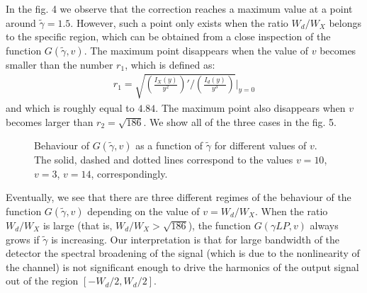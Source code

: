 \documentclass{article}
\begin{document}
In the fig. 4 we observe that the correction reaches a maximum value at a point around $\tilde{\gamma} = 1.5$. However, such a point only exists when the ratio $W_{d}/W_{X}$ belongs to the specific region, which can be obtained from a close inspection of the function $G(\tilde{\gamma}, v)$. The maximum point disappears when the value of $v$ becomes smaller than the number $r_{1}$, which is defined as: 
\begin{eqnarray}\label{5r1definition}
    r_{1} = \sqrt{\left(\frac{I_{X}(y)}{y^{2}}\right)'\bigg/ \left(\frac{I_{d}(y)}{y^{3}}\right)}\bigg |_{y=0}
\end{eqnarray}
and which is roughly equal to $4.84$. The maximum point also disappears when $v$ becomes larger than $r_{2} = \sqrt{186}$. We show all of the three cases in the fig. 5. 
\begin{figure}[hbt!]
	\centering
	\caption{Behaviour of $G(\tilde{\gamma}, v)$ as a function of $\tilde{\gamma}$ for different values of $v$. The solid, dashed and dotted lines correspond to the values $v=10$, $v=3$, $v=14$, correspondingly.} 
	\label{fig:2}
\end{figure}

Eventually, we see that there are three different regimes of the behaviour of the function $G(\tilde{\gamma}, v)$ depending on the value of $v=W_{d}/W_{X}$. When the ratio $W_{d}/W_{X}$ is large (that is, $W_{d}/W_{X}>\sqrt{186}$), the function $G(\gamma LP, v)$ always grows if $\tilde{\gamma}$ is increasing. Our interpretation is that for large bandwidth of the detector the spectral broadening of the signal (which is due to the nonlinearity of the channel) is not significant enough to drive the harmonics of the output signal out of the region $[-W_{d}/2,W_{d}/2]$.
\end{document}
